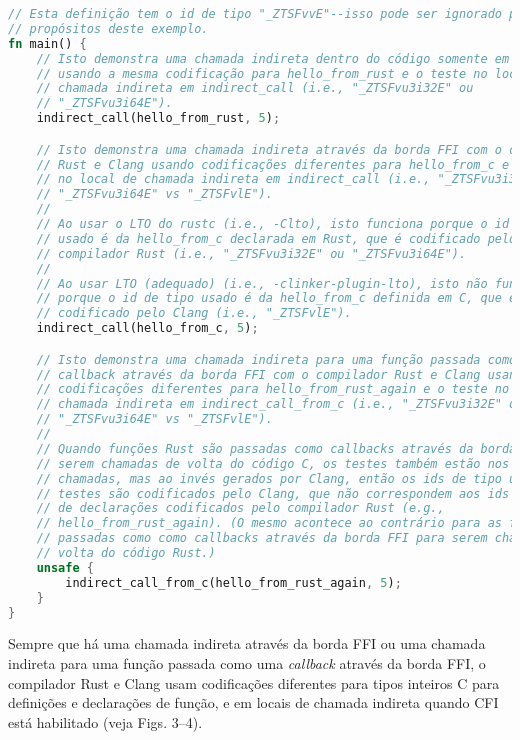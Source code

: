 \documentclass{article}
\begin{document}
\begin{lstlisting}[language=Rust, caption={Exemplo de programa Rust usando tipos inteiros Rust e a codificação do compilador Rust.}]
// Esta definição tem o id de tipo "_ZTSFvvE"--isso pode ser ignorado para os
// propósitos deste exemplo.
fn main() {
    // Isto demonstra uma chamada indireta dentro do código somente em Rust
    // usando a mesma codificação para hello_from_rust e o teste no local de
    // chamada indireta em indirect_call (i.e., "_ZTSFvu3i32E" ou
    // "_ZTSFvu3i64E").
    indirect_call(hello_from_rust, 5);

    // Isto demonstra uma chamada indireta através da borda FFI com o compilador
    // Rust e Clang usando codificações diferentes para hello_from_c e o teste
    // no local de chamada indireta em indirect_call (i.e., "_ZTSFvu3i32E" ou
    // "_ZTSFvu3i64E" vs "_ZTSFvlE").
    //
    // Ao usar o LTO do rustc (i.e., -Clto), isto funciona porque o id de tipo
    // usado é da hello_from_c declarada em Rust, que é codificado pelo
    // compilador Rust (i.e., "_ZTSFvu3i32E" ou "_ZTSFvu3i64E").
    //
    // Ao usar LTO (adequado) (i.e., -clinker-plugin-lto), isto não funciona
    // porque o id de tipo usado é da hello_from_c definida em C, que é
    // codificado pelo Clang (i.e., "_ZTSFvlE").
    indirect_call(hello_from_c, 5);

    // Isto demonstra uma chamada indireta para uma função passada como uma
    // callback através da borda FFI com o compilador Rust e Clang usando
    // codificações diferentes para hello_from_rust_again e o teste no local de
    // chamada indireta em indirect_call_from_c (i.e., "_ZTSFvu3i32E" ou
    // "_ZTSFvu3i64E" vs "_ZTSFvlE").
    //
    // Quando funções Rust são passadas como callbacks através da borda FFI para
    // serem chamadas de volta do código C, os testes também estão nos locais de
    // chamadas, mas ao invés gerados por Clang, então os ids de tipo usados nos
    // testes são codificados pelo Clang, que não correspondem aos ids de tipo
    // de declarações codificados pelo compilador Rust (e.g.,
    // hello_from_rust_again). (O mesmo acontece ao contrário para as funções C
    // passadas como como callbacks através da borda FFI para serem chamadas de
    // volta do código Rust.)
    unsafe {
        indirect_call_from_c(hello_from_rust_again, 5);
    }
}
\end{lstlisting}

Sempre que há uma chamada indireta através da borda FFI ou uma chamada indireta para uma função passada como uma \textit{callback} através da borda FFI, o compilador Rust e Clang usam codificações diferentes para tipos inteiros C para definições e declarações de função, e em locais de chamada indireta quando CFI está habilitado (veja Figs. 3–4).
\end{document}

